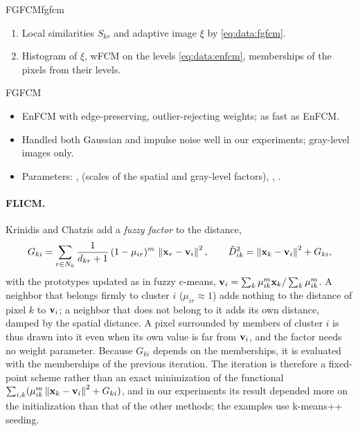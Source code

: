 \begin{algobox}{FGFCM}{fgfcm}
\begin{enumerate}[leftmargin=*]
  \item Local similarities $S_{kr}$ and adaptive image $\xi$ by \eqref{eq:data:fgfcm}.
  \item Histogram of $\xi$, wFCM on the levels \eqref{eq:data:enfcm}, memberships of the pixels from their levels.
\end{enumerate}
\end{algobox}
\begin{summarybox}{FGFCM}
\begin{itemize}
  \item EnFCM with edge-preserving, outlier-rejecting weights; as fast as EnFCM.
  \item Handled both Gaussian and impulse noise well in our experiments; gray-level images only.
  \item Parameters: ,  (scales of the spatial and gray-level factors), , .
\end{itemize}
\end{summarybox}

\paragraph{FLICM.} Krinidis and Chatzis \cite{krinidis:2010:flicm} add a \emph{fuzzy factor} to the distance,
\begin{equation}
  G_{ki}=\sum_{r\in N_k}\frac{1}{d_{kr}+1}\,(1-\mu_{ir})^m\,\left\lVert \mathbf{x}_r-\mathbf{v}_i \right\rVert^2,\qquad
  \tilde D^2_{ik}=\left\lVert \mathbf{x}_k-\mathbf{v}_i \right\rVert^2+G_{ki},
  \label{eq:data:flicm}
\end{equation}
with the prototypes updated as in fuzzy c-means, $\mathbf{v}_i=\sum_k\mu_{ik}^m\mathbf{x}_k/\sum_k\mu_{ik}^m$. A neighbor that belongs firmly to cluster $i$ ($\mu_{ir}\approx1$) adds nothing to the distance of pixel $k$ to $\mathbf{v}_i$; a neighbor that does not belong to it adds its own distance, damped by the spatial distance. A pixel surrounded by members of cluster $i$ is thus drawn into it even when its own value is far from $\mathbf{v}_i$, and the factor needs no weight parameter. Because $G_{ki}$ depends on the memberships, it is evaluated with the memberships of the previous iteration. The iteration is therefore a fixed-point scheme rather than an exact minimization of the functional $\sum_{i,k}(\mu_{ik}^m\left\lVert \mathbf{x}_k-\mathbf{v}_i \right\rVert^2+G_{ki})$, and in our experiments its result depended more on the initialization than that of the other methods; the examples use k-means++ seeding.

